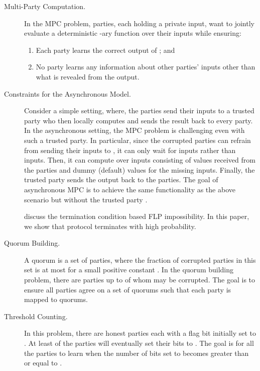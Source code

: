 \documentclass[11pt,letter]{article}
\theoremstyle{mytheoremstyle}
\begin{document}
\begin{description}
	\item[Multi-Party Computation.]
	In the MPC problem,  parties, each holding a private input, want to jointly evaluate a deterministic -ary function  over their inputs while ensuring:
	
	\smallskip
	\begin{enumerate}
		\item Each party learns the correct output of ; and
		\item No party learns any information about other parties' inputs other than what is revealed from the output.
	\end{enumerate}
	
	\item[Constraints for the Asynchronous Model.]
	Consider a simple setting, where, the  parties send their inputs to a trusted party  who then locally computes  and sends the result back to every party.
	In the asynchronous setting, the MPC problem is challenging even with such a trusted party. In particular, since the  corrupted parties can refrain from sending their inputs to , it can only wait for  inputs rather than  inputs. Then, it can compute  over  inputs consisting of  values received from the parties and  dummy (default) values for the missing inputs. Finally, the trusted party sends the output back to the parties.
	The goal of asynchronous MPC is to achieve the same functionality as the above scenario but without the trusted party .
	
	discuss the termination condition based FLP impossibility. In this paper, we show that protocol terminates with high probability.  
	
	\item[Quorum Building.]
	A quorum is a set of  parties, where the fraction of corrupted parties in this set is at most  for a small positive constant . In the quorum building problem, there are  parties up to  of whom may be corrupted. The goal is to ensure all parties agree on a set of  quorums such that each party is mapped to  quorums.

	\item[Threshold Counting.]
	In this problem, there are  honest parties each with a flag bit initially set to . At least  of the parties will eventually set their bits to . The goal is for all the parties to learn when the number of bits set to  becomes greater than or equal to .
	
\end{description}
\end{document}
